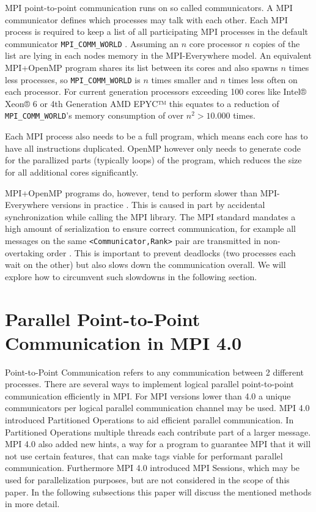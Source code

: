 \documentclass[sigconf]{acmart}
\begin{document}
MPI point-to-point communication runs on so called communicators.
A MPI communicator defines which processes may talk with each other.
Each MPI process is required to keep a list of all participating MPI processes in the default communicator \verb|MPI_COMM_WORLD| \cite{mpi40}.
Assuming an $n$ core processor $n$ copies of the list are lying in each nodes memory in the MPI-Everywhere model.
An equivalent MPI+OpenMP program shares its list between its cores and also spawns $n$ times less processes, so \verb|MPI_COMM_WORLD| is $n$ times smaller and $n$ times less often on each processor.
For current generation processors exceeding 100 cores like Intel® Xeon® 6 \cite{intelXeon6} or 4th Generation AMD EPYC™ \cite{amd4thGenEpyc} this equates to a reduction of \verb|MPI_COMM_WORLD|'s memory consumption of over $n^2 > 10.000$ times.

Each MPI process also needs to be a full program, which means each core has to have all instructions duplicated.
OpenMP however only needs to generate code for the parallized parts (typically loops) of the program, which reduces the size for all additional cores significantly.

MPI+OpenMP programs do, however, tend to perform slower than MPI-Everywhere versions in practice \cite{zambreLessonsLearned2022}.
This is caused in part by accidental synchronization while calling the MPI library.
The MPI standard mandates a high amount of serialization to ensure correct communication, for example all messages on the same \verb|<Communicator,Rank>| pair are transmitted in non-overtaking order \cite{mpi40}.
This is important to prevent deadlocks (two processes each wait on the other) but also slows down the communication overall.
We will explore how to circumvent such slowdowns in the following section.


\section{Parallel Point-to-Point Communication in MPI 4.0}

Point-to-Point Communication refers to any communication between 2 different processes.
There are several ways to implement logical parallel point-to-point communication efficiently in MPI.
For MPI versions lower than 4.0 a unique communicators per logical parallel communication channel may be used.
MPI 4.0 introduced Partitioned Operations to aid efficient parallel communication.
In Partitioned Operations multiple threads each contribute part of a larger message.
MPI 4.0 also added new hints, a way for a program to guarantee MPI that it will not use certain features, that can make tags viable for performant parallel communication.
Furthermore MPI 4.0 introduced MPI Sessions, which may be used for parallelization purposes, but are not considered in the scope of this paper.
In the following subsections this paper will discuss the mentioned methods in more detail.
\end{document}
